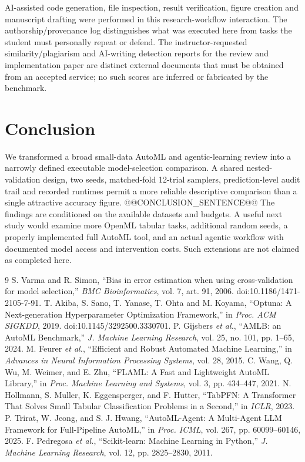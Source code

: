 \documentclass[11pt,a4paper]{article}
\begin{document}
AI-assisted code generation, file inspection, result verification, figure creation and manuscript drafting were performed in this research-workflow interaction. The authorship/provenance log distinguishes what was executed here from tasks the student must personally repeat or defend. The instructor-requested similarity/plagiarism and AI-writing detection reports for the review and implementation paper are distinct external documents that must be obtained from an accepted service; no such scores are inferred or fabricated by the benchmark.

\section{Conclusion}
We transformed a broad small-data AutoML and agentic-learning review into a narrowly defined executable model-selection comparison. A shared nested-validation design, two seeds, matched-fold 12-trial samplers, prediction-level audit trail and recorded runtimes permit a more reliable descriptive comparison than a single attractive accuracy figure. @@CONCLUSION_SENTENCE@@ The findings are conditioned on the available datasets and budgets. A useful next study would examine more OpenML tabular tasks, additional random seeds, a properly implemented full AutoML tool, and an actual agentic workflow with documented model access and intervention costs. Such extensions are not claimed as completed here.

\clearpage
\begin{thebibliography}{9}
 S. Varma and R. Simon, ``Bias in error estimation when using cross-validation for model selection,'' \emph{BMC Bioinformatics}, vol. 7, art. 91, 2006. doi:10.1186/1471-2105-7-91.
 T. Akiba, S. Sano, T. Yanase, T. Ohta and M. Koyama, ``Optuna: A Next-generation Hyperparameter Optimization Framework,'' in \emph{Proc. ACM SIGKDD}, 2019. doi:10.1145/3292500.3330701.
 P. Gijsbers \emph{et al.}, ``AMLB: an AutoML Benchmark,'' \emph{J. Machine Learning Research}, vol. 25, no. 101, pp. 1--65, 2024.
 M. Feurer \emph{et al.}, ``Efficient and Robust Automated Machine Learning,'' in \emph{Advances in Neural Information Processing Systems}, vol. 28, 2015.
 C. Wang, Q. Wu, M. Weimer, and E. Zhu, ``FLAML: A Fast and Lightweight AutoML Library,'' in \emph{Proc. Machine Learning and Systems}, vol. 3, pp. 434--447, 2021.
 N. Hollmann, S. Muller, K. Eggensperger, and F. Hutter, ``TabPFN: A Transformer That Solves Small Tabular Classification Problems in a Second,'' in \emph{ICLR}, 2023.
 P. Trirat, W. Jeong, and S. J. Hwang, ``AutoML-Agent: A Multi-Agent LLM Framework for Full-Pipeline AutoML,'' in \emph{Proc. ICML}, vol. 267, pp. 60099--60146, 2025.
 F. Pedregosa \emph{et al.}, ``Scikit-learn: Machine Learning in Python,'' \emph{J. Machine Learning Research}, vol. 12, pp. 2825--2830, 2011.
\end{thebibliography}
\end{document}
